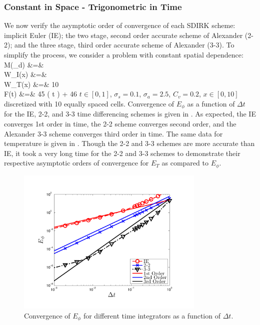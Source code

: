 \newpage

\subsubsection{Constant in Space - Trigonometric in Time}
\label{sec:time_convergence}


We now verify the asymptotic order of convergence of each SDIRK scheme: implicit Euler (IE); the two stage, second order accurate scheme of Alexander (2-2); and the three stage, third order accurate scheme of Alexander (3-3).
To simplify the process, we consider a problem with constant spatial dependence:
\beanum
M(\mu_d) &=&  \\
W_I(x) &=&  \\
W_T(x) &=&  10 \\
F(t) &=& 45 \cos\left( \pi t \right) + 46 \pec
\eeanum
$t \in[0,1]$, $\sigma_s = 0.1$, $\sigma_a = 2.5$, $C_v = 0.2$, $x\in[0,10]$ discretized with 10 equally spaced cells.  Convergence of $E_{\phi}$ as a function of $\Delta t$ for the IE, 2-2, and 3-3 time differencing schemes is given in .
As expected, the IE converges 1st order in time, the 2-2 scheme converges second order, and the Alexander 3-3 scheme converges third order in time.
The same data for temperature is given in .  
Though the 2-2 and 3-3 schemes are more accurate than IE, it took a very long time for the 2-2 and 3-3 schemes to demonstrate their respective asymptotic orders of convergence for $E_T$ as compared to $E_{\phi}$.
\begin{figure}[!htp]
\centering
\includegraphics[width=9cm,trim=0.25in  0.2in 0.75in 0.5in,clip=true]{chapter6_grey_radtran/Dissertation_Data/Time_Integrators_Convergence_Phi.pdf}
\caption{Convergence of $E_{\phi}$ for different time integrators as a function of $\Delta t$.}
\label{fig:e_phi_time}
\end{figure}
